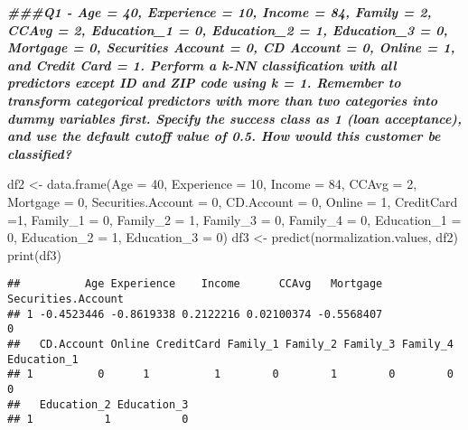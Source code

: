 \documentclass[
]{article}
\newenvironment{Shaded}{\begin{snugshade}}{\end{snugshade}}
\newcommand{\AttributeTok}[1]{\textcolor[rgb]{0.77,0.63,0.00}{#1}}
\newcommand{\DecValTok}[1]{\textcolor[rgb]{0.00,0.00,0.81}{#1}}
\newcommand{\DocumentationTok}[1]{\textcolor[rgb]{0.56,0.35,0.01}{\textbf{\textit{#1}}}}
\newcommand{\FunctionTok}[1]{\textcolor[rgb]{0.00,0.00,0.00}{#1}}
\newcommand{\NormalTok}[1]{#1}
\newcommand{\OtherTok}[1]{\textcolor[rgb]{0.56,0.35,0.01}{#1}}
\begin{document}
\begin{Shaded}
\begin{Highlighting}[]
\DocumentationTok{\#\#\#Q1 {-} Age = 40, Experience = 10, Income = 84, Family = 2, CCAvg = 2, Education\_1 = 0, Education\_2 = 1, Education\_3 = 0, Mortgage = 0, Securities Account = 0, CD Account = 0, Online = 1, and Credit Card = 1. Perform a k{-}NN classification with all predictors except ID and ZIP code using k = 1. Remember to transform categorical predictors with more than two categories into dummy variables first. Specify the success class as 1 (loan acceptance), and use the default cutoff value of 0.5. How would this customer be classified?}

\NormalTok{df2 }\OtherTok{\textless{}{-}} \FunctionTok{data.frame}\NormalTok{(}\AttributeTok{Age =} \DecValTok{40}\NormalTok{, }\AttributeTok{Experience =} \DecValTok{10}\NormalTok{, }\AttributeTok{Income =} \DecValTok{84}\NormalTok{, }\AttributeTok{CCAvg =} \DecValTok{2}\NormalTok{,}
                       \AttributeTok{Mortgage =} \DecValTok{0}\NormalTok{, }\AttributeTok{Securities.Account =} \DecValTok{0}\NormalTok{, }\AttributeTok{CD.Account =} \DecValTok{0}\NormalTok{, }
                       \AttributeTok{Online =} \DecValTok{1}\NormalTok{, }\AttributeTok{CreditCard =}\DecValTok{1}\NormalTok{, }\AttributeTok{Family\_1 =} \DecValTok{0}\NormalTok{, }\AttributeTok{Family\_2 =} \DecValTok{1}\NormalTok{, }
                       \AttributeTok{Family\_3 =} \DecValTok{0}\NormalTok{, }\AttributeTok{Family\_4 =} \DecValTok{0}\NormalTok{, }\AttributeTok{Education\_1 =} \DecValTok{0}\NormalTok{, }
                       \AttributeTok{Education\_2 =} \DecValTok{1}\NormalTok{, }\AttributeTok{Education\_3 =} \DecValTok{0}\NormalTok{)}
\NormalTok{df3 }\OtherTok{\textless{}{-}} \FunctionTok{predict}\NormalTok{(normalization.values, df2)}
\FunctionTok{print}\NormalTok{(df3)}
\end{Highlighting}
\end{Shaded}

\begin{verbatim}
##          Age Experience    Income      CCAvg   Mortgage Securities.Account
## 1 -0.4523446 -0.8619338 0.2122216 0.02100374 -0.5568407                  0
##   CD.Account Online CreditCard Family_1 Family_2 Family_3 Family_4 Education_1
## 1          0      1          1        0        1        0        0           0
##   Education_2 Education_3
## 1           1           0
\end{verbatim}
\end{document}
